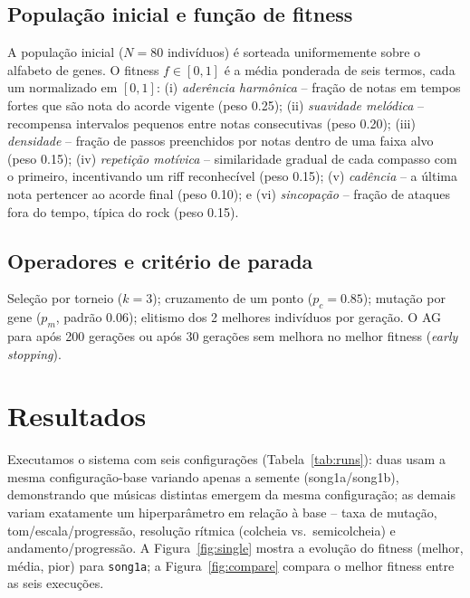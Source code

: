 \documentclass{article}
\begin{document}
\subsection{População inicial e função de fitness}
A população inicial ($N{=}80$ indivíduos) é sorteada uniformemente sobre o
alfabeto de genes. O fitness $f \in [0,1]$ é a média ponderada de seis
termos, cada um normalizado em $[0,1]$: (i) \emph{aderência harmônica} --
fração de notas em tempos fortes que são nota do acorde vigente (peso
0.25); (ii) \emph{suavidade melódica} -- recompensa intervalos pequenos
entre notas consecutivas (peso 0.20); (iii) \emph{densidade} -- fração de
passos preenchidos por notas dentro de uma faixa alvo (peso 0.15); (iv)
\emph{repetição motívica} -- similaridade gradual de cada compasso com o
primeiro, incentivando um riff reconhecível (peso 0.15); (v)
\emph{cadência} -- a última nota pertencer ao acorde final (peso 0.10); e
(vi) \emph{sincopação} -- fração de ataques fora do tempo, típica do rock
(peso 0.15).

\subsection{Operadores e critério de parada}
Seleção por torneio ($k{=}3$); cruzamento de um ponto ($p_c{=}0.85$);
mutação por gene ($p_m$, padrão 0.06); elitismo dos 2 melhores indivíduos
por geração. O AG para após 200 gerações ou após 30 gerações sem melhora no
melhor fitness (\emph{early stopping}).

\section{Resultados}\label{sec:results}

Executamos o sistema com seis configurações (Tabela~\ref{tab:runs}): duas
usam a mesma configuração-base variando apenas a semente (song1a/song1b),
demonstrando que músicas distintas emergem da mesma configuração; as
demais variam exatamente um hiperparâmetro em relação à base -- taxa de
mutação, tom/escala/progressão, resolução rítmica (colcheia
vs.\ semicolcheia) e andamento/progressão. A Figura~\ref{fig:single}
mostra a evolução do fitness (melhor, média, pior) para \texttt{song1a};
a Figura~\ref{fig:compare} compara o melhor fitness entre as seis
execuções.
\end{document}
